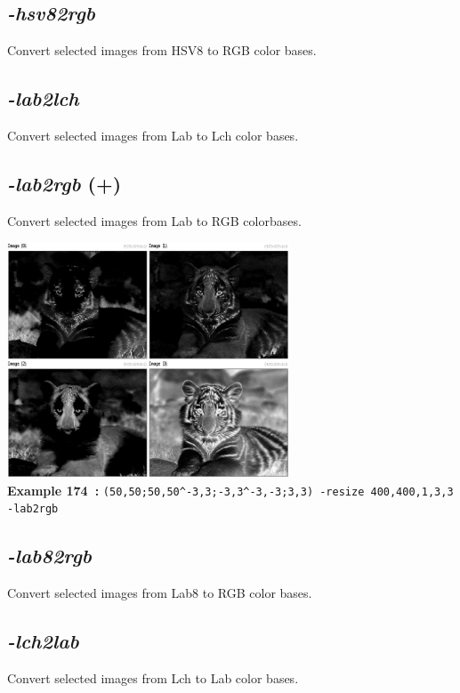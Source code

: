 \documentclass[a4paper,11pt,twoside]{book}
\begin{document}
\subsection{\emph{-hsv82rgb} }\vspace*{-0.5em}
Convert selected images from HSV8 to RGB color bases.


\subsection{\emph{-lab2lch} }\vspace*{-0.5em}
Convert selected images from Lab to Lch color bases.


\subsection{\emph{-lab2rgb} (+)}\vspace*{-0.5em}
Convert selected images from Lab to RGB colorbases.
\begin{center}\includegraphics[keepaspectratio=true,height=7cm,width=\textwidth]{img/gmic_def174.jpg}\\
{\footnotesize \textbf{Example 174~:} \texttt{(50,50;50,50\textasciicircum -3,3;-3,3\textasciicircum -3,-3;3,3) -resize 400,400,1,3,3 -lab2rgb}}
\end{center}

\subsection{\emph{-lab82rgb} }\vspace*{-0.5em}
Convert selected images from Lab8 to RGB color bases.


\subsection{\emph{-lch2lab} }\vspace*{-0.5em}
Convert selected images from Lch to Lab color bases.
\end{document}
